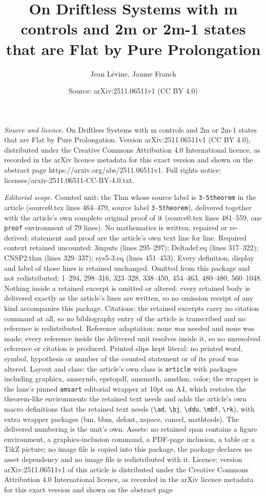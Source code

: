 \documentclass[10pt,a4paper]{amsart}
\title[On Driftless Systems with m controls and 2m or 2m-1 states t]{On Driftless Systems with m controls and 2m or 2m-1 states that are Flat by Pure Prolongation}
\author{Jean L\'evine, Jaume Franch}
\date{Source: arXiv:2511.06511v1 (CC BY 4.0)}
\begin{document}
\maketitle

\noindent\emph{Source and licence.} On Driftless Systems with m controls and 2m or 2m-1 states that are Flat by Pure Prolongation. Version arXiv:2511.06511v1 (CC BY 4.0), distributed under the Creative Commons Attribution 4.0 International licence, as recorded in the arXiv licence metadata for this exact version and shown on the abstract page https://arxiv.org/abs/2511.06511v1. Full rights notice: licenses/arxiv-2511.06511-CC-BY-4.0.txt.\par\smallskip

\noindent\textit{Editorial scope.} Counted unit: the Thm whose source label is \texttt{3-5theorem} in the article (source0.tex lines 464--479, source label \texttt{3-5theorem}), delivered together with the article's own complete original proof of it (source0.tex lines 481--559, one \texttt{proof} environment of 79 lines). No mathematics is written, repaired or re-derived: statement and proof are the article's own text line for line. Required context retained uncounted: 3inputs (lines 295--297); Deltadef:eq (lines 317--322); CNSP2:thm (lines 329--337); sys5-3:eq (lines 451--453). Every definition, display and label of those lines is retained unchanged. Omitted from this package and not redistributed: 1--294, 298--316, 323--328, 338--450, 454--463, 480--480, 560--1048. Nothing inside a retained excerpt is omitted or altered: every retained body is delivered exactly as the article's lines are written, so no omission receipt of any kind accompanies this package. Citations: the retained excerpts carry no citation command at all, so no bibliography entry of the article is transcribed and no reference is redistributed. Reference adaptation: none was needed and none was made; every reference inside the delivered unit resolves inside it, so no unresolved reference or citation is produced. Printed slips kept literal: no printed word, symbol, hypothesis or number of the counted statement or of its proof was altered. Layout and class: the article's own class is \texttt{article} with packages including graphicx, amssymb, epstopdf, amsmath, amsthm, color; the wrapper is the lane's pinned \texttt{amsart} editorial wrapper at 10pt on A4, which restates the theorem-like environments the retained text needs and adds the article's own macro definitions that the retained text needs (\texttt{\textbackslash ad}, \texttt{\textbackslash bj}, \texttt{\textbackslash ddu}, \texttt{\textbackslash mbf}, \texttt{\textbackslash rk}), with extra wrapper packages (bm, bbm, dsfont, xspace, cancel, mathtools). The delivered numbering is the unit's own. Assets: no retained span contains a figure environment, a graphics-inclusion command, a PDF-page inclusion, a table or a TikZ picture; no image file is copied into this package, the package declares no asset dependency and no image file is redistributed with it. Licence: version arXiv:2511.06511v1 of this article is distributed under the Creative Commons Attribution 4.0 International licence, as recorded in the arXiv licence metadata for this exact version and shown on the abstract page 
\end{document}
